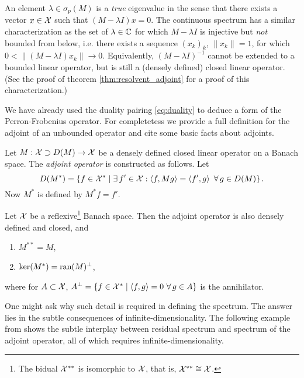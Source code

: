 An element $\lambda \in \sigma_p (M)$ is a \emph{true} eigenvalue in the sense that there 
exists a vector $x \in \mathcal{X}$ such that $(M - \lambda I) x = 0$. The continuous spectrum 
has a similar characterization as the set of $\lambda \in \mathbb{C}$ for which $M - \lambda I$ 
is injective but \emph{not} bounded from below, i.e. there exists a sequence $(x_k)_k$, 
$\| x_k \| = 1$, for which $0 < \| (M - \lambda I) x_k \| \to 0$. Equivalently, 
$(M - \lambda I)^{-1}$ cannot be extended to a bounded linear operator, but is still a 
(densely defined) closed linear operator. (See the proof of theorem 
\ref{thm:resolvent_adjoint} for a proof of this characterization.)

We have already used the duality pairing \ref{eq:duality} to deduce a form of the 
Perron-Frobenius operator. For completetess we provide a full definition for the adjoint 
of an unbounded operator and cite some basic facts about adjoints. 

\begin{definition}
    \label{thm:adjoint}
    Let $M : \mathcal{X} \supset D(M) \to \mathcal{X}$ be a densely defined closed linear operator on 
    a Banach space. The \emph{adjoint operator} is constructed as follows. Let 
    \begin{equation}
        D(M^*) = \left\{ f \in \mathcal{X}^* \mid \exists\, f' \in \mathcal{X} : 
        \left\langle f, M g \right\rangle = \left\langle f', g \right\rangle\ \forall\, 
        g \in D(M) \right\} . 
    \end{equation}
    Now $M^*$ is defined by $M^* f = f'$. 
\end{definition}

\begin{lemma}
    Let $\mathcal{X}$ be a reflexive\footnote{
        The bidual $\mathcal{X}^{**}$ is isomorphic to $\mathcal{X}$, that is, $\mathcal{X}^{**} \cong \mathcal{X}$. 
    } Banach space. Then the adjoint operator is also densely defined and closed, and
    \begin{enumerate}
        \item $M^{**} = M$,
        \item $\ker (M^*) = \text{ran} (M)^\perp$,
    \end{enumerate}
    where for $A \subset \mathcal{X}$, $A^\perp = \left\{ f \in \mathcal{X}^* \mid 
    \left\langle f, g \right\rangle = 0\ \forall\, g \in A \right\}$ is the annihilator. 
\end{lemma}

One might ask why such detail is required in defining the spectrum. The answer lies in 
the subtle consequences of infinite-dimensionality. The following example from 
\cite{spectraexample} shows the subtle interplay between residual spectrum and spectrum 
of the adjoint operator, all of which requires infinite-dimensionality. 

